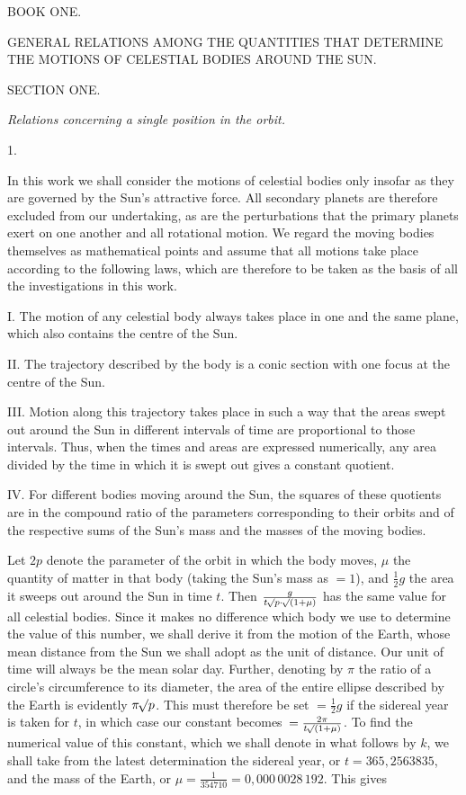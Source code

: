 \clearpage
{}
\begin{center}
{\Large BOOK ONE.}\par\bigskip
{\large GENERAL RELATIONS AMONG THE QUANTITIES THAT DETERMINE THE MOTIONS OF CELESTIAL BODIES AROUND THE SUN.}\par\bigskip
{}
{\large SECTION ONE.}\par\medskip
\emph{Relations concerning a single position in the orbit.}\par\bigskip
{}1.
\end{center}
In this work we shall consider the motions of celestial bodies only insofar as they are governed by the Sun's attractive force. All secondary planets are therefore excluded from our undertaking, as are the perturbations that the primary planets exert on one another and all rotational motion. We regard the moving bodies themselves as mathematical points and assume that all motions take place according to the following laws, which are therefore to be taken as the basis of all the investigations in this work.

I. The motion of any celestial body always takes place in one and the same plane, which also contains the centre of the Sun.

II. The trajectory described by the body is a conic section with one focus at the centre of the Sun.

III. Motion along this trajectory takes place in such a way that the areas swept out around the Sun in different
intervals of time are proportional to those intervals. Thus, when the times and areas are expressed numerically, any area divided by the time in which it is swept out gives a constant quotient.

IV. For different bodies moving around the Sun, the squares of these quotients are in the compound ratio of the parameters corresponding to their orbits and of the respective sums of the Sun's mass and the masses of the moving bodies.

Let $2p$ denote the parameter of the orbit in which the body moves, $\mu$ the quantity of matter in that body (taking the Sun's mass as $=1$), and $\frac{1}{2}g$ the area it sweeps out around the Sun in time $t$. Then $\frac{g}{t\mathord{{}^{}\!\surd}p\cdot\mathord{{}^{}\!\surd}(1+\mu)}$ has the same value for all celestial bodies. Since it makes no difference which body we use to determine the value of this number, we shall derive it from the motion of the Earth, whose mean distance from the Sun we shall adopt as the unit of distance. Our unit of time will always be the mean solar day. Further, denoting by $\pi$ the ratio of a circle's circumference to its diameter, the area of the entire ellipse described by the Earth is evidently $\pi\mathord{{}^{}\!\surd}p$. This must therefore be set $=\frac{1}{2}g$ if the sidereal year is taken for $t$, in which case our constant becomes~$=\frac{2\pi}{t\mathord{{}^{}\!\surd}(1+\mu)}$. To find the numerical value of this constant, which we shall denote in what follows by $k$, we shall take from the latest determination the sidereal year, or $t=365{,}2563835$, and the mass of the Earth, or $\mu=\frac{1}{354710}=0{,}000\,0028\,192$. This gives

